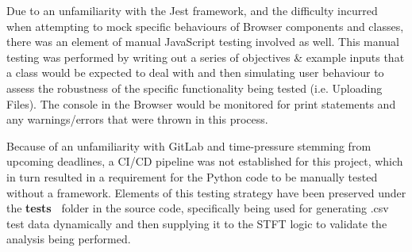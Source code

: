 Due to an unfamiliarity with the Jest framework, and the difficulty incurred when attempting to mock specific behaviours of Browser components and classes, there was an element of manual JavaScript testing involved as well. This manual testing was performed by writing out a series of objectives \& example inputs that a class would be expected to deal with and then simulating user behaviour to assess the robustness of the specific functionality being tested (i.e. Uploading Files). The console in the Browser would be monitored for print statements and any warnings/errors that were thrown in this process.

Because of an unfamiliarity with GitLab and time-pressure stemming from upcoming deadlines, a CI/CD pipeline was not established for this project, which in turn resulted in a requirement for the Python code to be manually tested without a framework. Elements of this testing strategy have been preserved under the {\bf tests\ } folder in the source code, specifically being used for generating .csv test data dynamically and then supplying it to the STFT logic to validate the analysis being performed.

\newpage